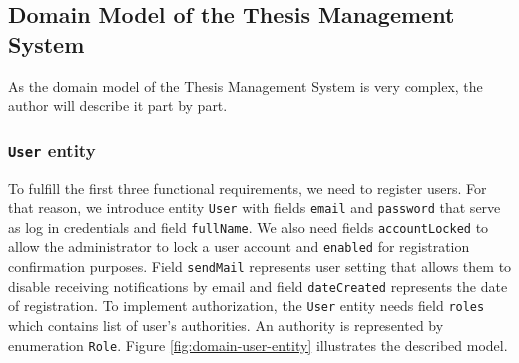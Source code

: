 \subsection{Domain Model of the Thesis Management System}

As the domain model of the Thesis Management System is very complex, the author will describe it part by part.

\subsubsection{\texttt{User} entity}

To fulfill the first three functional requirements, we need to register users. For that reason, we introduce entity \texttt{User} with fields \texttt{email} and \texttt{password} that serve as log in credentials and field \texttt{fullName}. We also need fields \texttt{accountLocked} to allow the administrator to lock a user account and \texttt{enabled} for registration confirmation purposes. Field \texttt{sendMail} represents user setting that allows them to disable receiving notifications by email and field \texttt{dateCreated} represents the date of registration. To implement authorization, the \texttt{User} entity needs field \texttt{roles} which contains list of user's authorities. An authority is represented by enumeration \texttt{Role}. Figure \ref{fig:domain-user-entity} illustrates the described model.

